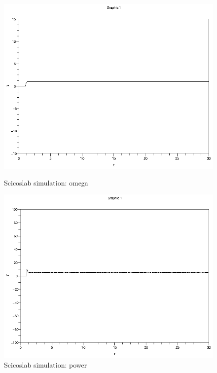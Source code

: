 \documentclass[a4paper,12pt,oneside]{article}
\begin{document}
\begin{figure}
	\centering
	\includegraphics[width=\columnwidth]{../controler/omega.eps}
	\caption{Scicoslab simulation: omega}
	\label{fig:simulation_omega}
	\centering
	\includegraphics[width=\columnwidth]{../controler/power.eps}
	\caption{Scicoslab simulation: power}
	\label{fig:simulation_power}
\end{figure}
\end{document}

